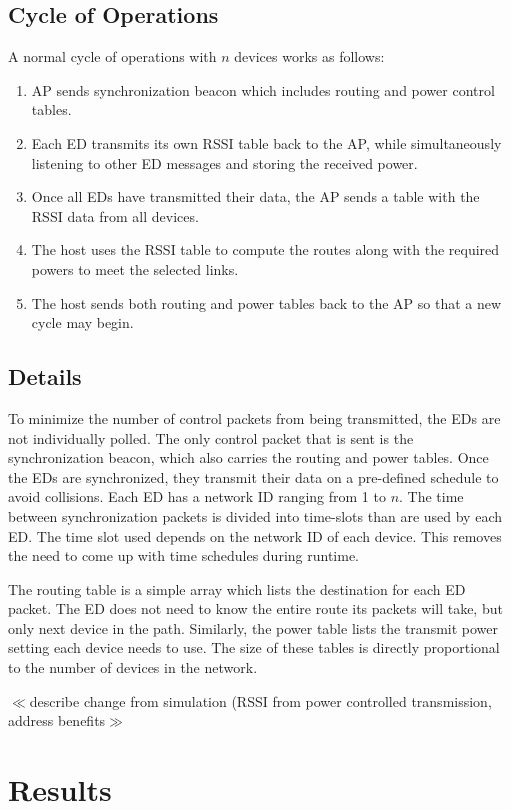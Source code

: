 \documentclass{article}
\begin{document}
\subsection{Cycle of Operations}
A normal cycle of operations with $n$ devices works as follows:
\begin{enumerate}
\item AP sends synchronization beacon which includes routing and power control tables.
\item Each ED transmits its own RSSI table back to the AP, while simultaneously listening to other ED messages and storing the received power.
\item Once all EDs have transmitted their data, the AP sends a table with the RSSI data from all devices.
\item The host uses the RSSI table to compute the routes along with the required powers to meet the selected links.
\item The host sends both routing and power tables back to the AP so that a new cycle may begin.
\end{enumerate}

\subsection{Details}
To minimize the number of control packets from being transmitted, the EDs are not individually polled. The only control packet that is sent is the synchronization beacon, which also carries the routing and power tables. Once the EDs are synchronized, they transmit their data on a pre-defined schedule to avoid collisions. Each ED has a network ID ranging from 1 to $n$. The time between synchronization packets is divided into time-slots than are used by each ED. The time slot used depends on the network ID of each device. This removes the need to come up with time schedules during runtime.

The routing table is a simple array which lists the destination for each ED packet. The ED does not need to know the entire route its packets will take, but only next device in the path. Similarly, the power table lists the transmit power setting each device needs to use. The size of these tables is directly proportional to the number of devices in the network.

$\ll$describe change from simulation (RSSI from power controlled transmission, address benefits$\gg$

\section{Results}
\end{document}
